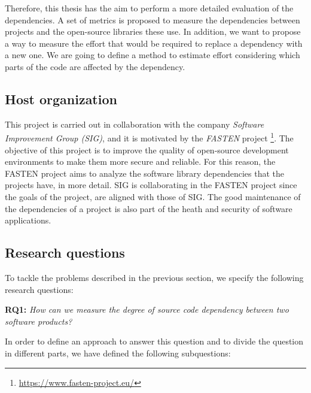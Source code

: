 \blankl
Therefore, this thesis has the aim to perform a more detailed evaluation of the dependencies. A set of metrics is proposed to measure the dependencies between projects and the open-source libraries these use. In addition, we want to propose a way to measure the effort that would be required to replace a dependency with a new one. We are going to define a method to estimate effort considering which parts of the code are affected by the dependency.

\subsection{Host organization}
This project is carried out in collaboration with the company \textit{Software Improvement Group (SIG)}, and it is motivated by the \textit{FASTEN} project \footnote{\url{https://www.fasten-project.eu/}}. The objective of this project is to improve the quality of open-source development environments to make them more secure and reliable. For this reason, the FASTEN project aims to analyze the software library dependencies that the projects have, in more detail. SIG is collaborating in the FASTEN project since the goals of the project, are aligned with those of SIG. The good maintenance of the dependencies of a project is also part of the heath and security of software applications.

\subsection{Research questions} %
To tackle the problems described in the previous section, we specify the following research questions:

\blankl
\textbf{RQ1:} \textit{How can we measure the degree of source code dependency between two software products?}

In order to define an approach to answer this question and to divide the question in different parts, we have defined the following subquestions:

